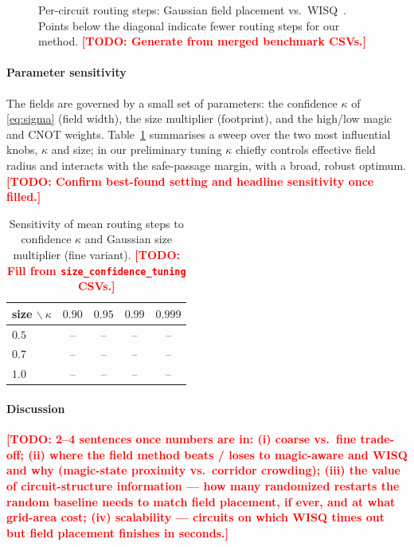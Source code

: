 \documentclass[10pt,conference]{IEEEtran}
\theoremstyle{definition}
\theoremstyle{remark}
\newcommand{\todo}[1]{\textcolor{red}{\textbf{[TODO: #1]}}}
\newcommand{\figslot}[2][0.95\linewidth]{%
    \setlength{\fboxsep}{0pt}%
    \fbox{\parbox[c][#2][c]{#1}{\centering\footnotesize\itshape
        \textcolor{gray}{[ figure placeholder — #1 wide ]}}}%
}
\begin{document}
\begin{figure}[t]
    \centering
    \figslot{1.6in}
    \caption{Per-circuit routing steps: Gaussian field placement vs.\
    WISQ~\cite{wisq}. Points below the diagonal indicate fewer routing steps for
    our method. \todo{Generate from merged benchmark CSVs.}}
    \label{fig:scatter}
\end{figure}

\paragraph{Parameter sensitivity}
The fields are governed by a small set of parameters: the confidence $\kappa$ of
\eqref{eq:sigma} (field width), the size multiplier (footprint), and the
high/low magic and CNOT weights. Table~\ref{tab:sweep} summarises a sweep over
the two most influential knobs, $\kappa$ and size; in our preliminary tuning
$\kappa$ chiefly controls effective field radius and interacts with the
safe-passage margin, with a broad, robust optimum.
\todo{Confirm best-found setting and headline sensitivity once filled.}

\begin{table}[t]
    \centering
    \caption{Sensitivity of mean routing steps to confidence $\kappa$ and
    Gaussian size multiplier (fine variant). \todo{Fill from
    \texttt{size\_confidence\_tuning} CSVs.}}
    \label{tab:sweep}
    \setlength{\tabcolsep}{6pt}
    \footnotesize
    \begin{tabular}{l cccc}
        \toprule
        \textbf{size $\backslash\ \kappa$} & $0.90$ & $0.95$ & $0.99$ & $0.999$ \\
        \midrule
        $0.5$ & -- & -- & -- & -- \\
        $0.7$ & -- & -- & -- & -- \\
        $1.0$ & -- & -- & -- & -- \\
        \bottomrule
    \end{tabular}
\end{table}

\paragraph{Discussion}
\todo{2--4 sentences once numbers are in: (i) coarse vs.\ fine trade-off;
(ii) where the field method beats / loses to magic-aware and WISQ and why
(magic-state proximity vs.\ corridor crowding); (iii) the value of
circuit-structure information --- how many randomized restarts the random
baseline needs to match field placement, if ever, and at what grid-area cost;
(iv) scalability --- circuits on which WISQ times out but field placement
finishes in seconds.}
\end{document}
